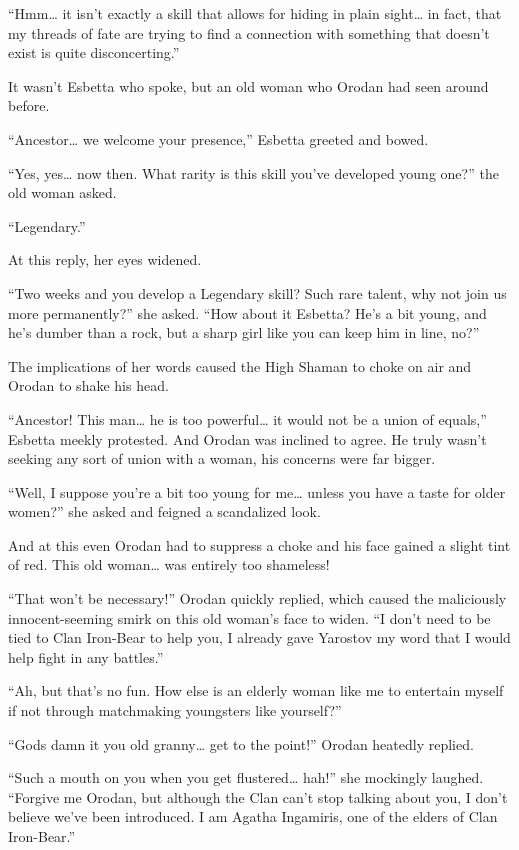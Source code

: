 \documentclass[a4paper,10pt]{book}
\begin{document}
“Hmm… it isn’t exactly a skill that allows for hiding in plain sight… in fact, that my threads of fate are trying to find a connection with something that doesn’t exist is quite disconcerting.”\par
It wasn’t Esbetta who spoke, but an old woman who Orodan had seen around before.\par
“Ancestor… we welcome your presence,” Esbetta greeted and bowed.\par
“Yes, yes… now then. What rarity is this skill you’ve developed young one?” the old woman asked.\par
“Legendary.”\par
At this reply, her eyes widened.\par
“Two weeks and you develop a Legendary skill? Such rare talent, why not join us more permanently?” she asked. “How about it Esbetta? He’s a bit young, and he’s dumber than a rock, but a sharp girl like you can keep him in line, no?”\par
The implications of her words caused the High Shaman to choke on air and Orodan to shake his head.\par
“Ancestor! This man… he is too powerful… it would not be a union of equals,” Esbetta meekly protested. And Orodan was inclined to agree. He truly wasn’t seeking any sort of union with a woman, his concerns were far bigger.\par
“Well, I suppose you’re a bit too young for me… unless you have a taste for older women?” she asked and feigned a scandalized look.\par
And at this even Orodan had to suppress a choke and his face gained a slight tint of red. This old woman… was entirely too shameless!\par
“That won’t be necessary!” Orodan quickly replied, which caused the maliciously innocent-seeming smirk on this old woman’s face to widen. “I don’t need to be tied to Clan Iron-Bear to help you, I already gave Yarostov my word that I would help fight in any battles.”\par
“Ah, but that’s no fun. How else is an elderly woman like me to entertain myself if not through matchmaking youngsters like yourself?”\par
“Gods damn it you old granny… get to the point!” Orodan heatedly replied.\par
“Such a mouth on you when you get flustered… hah!” she mockingly laughed. “Forgive me Orodan, but although the Clan can’t stop talking about you, I don’t believe we’ve been introduced. I am Agatha Ingamiris, one of the elders of Clan Iron-Bear.”\par
\end{document}
